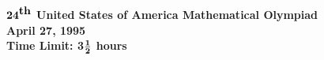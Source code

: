 \pagestyle{empty}
\setlength{\oddsidemargin}{.15in}
\setlength{\evensidemargin}{.15in}
\setlength{\textwidth}{6in}
\setlength{\textheight}{9.25in}
\setlength{\topmargin}{-.1in}
\setlength{\headheight}{0in}
\setlength{\headsep}{0in}
\setlength{\parskip}{15pt}
\setlength{\labelsep}{10pt}
\setlength{\parindent}{0pt}
\setlength{\medskipamount}{3ex} 
\setlength{\smallskipamount}{1ex}
\def\binom#1#2{{#1\choose#2}}
\def\dg{\raisebox{.15pt}{$^{\circ}$}}
\newenvironment{List}{%
    \begin{list}{}{\setlength{\labelwidth}{.15in}
    \setlength{\leftmargin}{.55in}
    \setlength{\rightmargin}{.25in}
    \setlength{\topsep}{0pt}
    \setlength{\partopsep}{0pt} 
    }}{\end{list}}
\newtheorem{fact}{Proposition}


\setlength{\baselineskip}{.24in}
\begin{center}
${\bf 24}^{\mbox{\bf th}}$ {\bf United States of America
Mathematical Olympiad} \\[.1in]
{\bf April 27, 1995}\\
{\bf Time Limit: 3}${{\bf 1}\over{\bf 2}}$ {\bf
hours}
\end{center}
